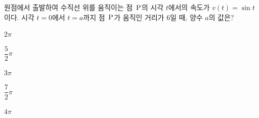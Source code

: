 \hspace*{2mm}\begin{minipage}[t]{\dimexpr\linewidth-2mm\relax}\vspace{0pt}
원점에서 출발하여 수직선 위를 움직이는 점~$\mathrm{P}$의 시각 $t$에서의 속도가 $v(t)=\sin t$이다. 시각 $t=0$에서 $t=a$까지 점~$\mathrm{P}$가 움직인 거리가 $6$일 때, 양수 $a$의 값은?
\begin{choices32}{\rule[-3ex]{0pt}{8ex}$2\pi$}{\rule[-3ex]{0pt}{8ex}$\dfrac{5}{2}\pi$}{\rule[-3ex]{0pt}{8ex}$3\pi$}{\rule[-3ex]{0pt}{8ex}$\dfrac{7}{2}\pi$}{\rule[-3ex]{0pt}{8ex}$4\pi$}\end{choices32}\end{minipage}
